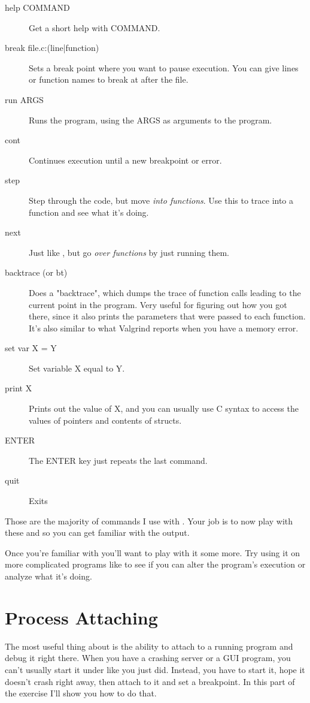 \begin{description}
\item[help COMMAND] Get a short help with COMMAND.
\item[break file.c:(line|function)] Sets a break point where you want to pause execution.  You can give lines or function names to break at after the file.
\item[run ARGS] Runs the program, using the ARGS as arguments to the program.
\item[cont] Continues execution until a new breakpoint or error.
\item[step] Step through the code, but move \emph{into functions}.  Use this to 
    trace into a function and see what it's doing.
\item[next] Just like , but go \emph{over functions} by just running them.
\item[backtrace (or bt)] Does a "backtrace", which dumps the trace of function
    calls leading to the current point in the program. Very useful for figuring
    out how you got there, since it also prints the parameters that were passed
    to each function.  It's also similar to what Valgrind reports when you have
    a memory error.
\item[set var X = Y] Set variable X equal to Y.
\item[print X] Prints out the value of X, and you can usually use C syntax to access
    the values of pointers and contents of structs.
\item[ENTER] The ENTER key just repeats the last command.
\item[quit] Exits 
\end{description}

Those are the majority of commands I use with .  Your job is to
now play with these and  so you can get familiar with the output.

Once you're familiar with  you'll want to play with it some more.
Try using it on more complicated programs like  to see if you
can alter the program's execution or analyze what it's doing.


\section{Process Attaching}

The most useful thing about  is the ability to attach to a running program and
debug it right there.  When you have a crashing server or a GUI program, you can't
usually start it under  like you just did.  Instead, you have to start
it, hope it doesn't crash right away, then attach to it and set a breakpoint.  In
this part of the exercise I'll show you how to do that.


